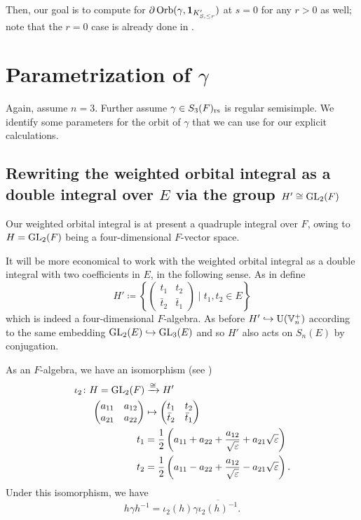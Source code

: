 Then, our goal is to compute for
$\partial \operatorname{Orb}(\gamma, \mathbf{1}_{K'_{S, \le r}})$
at $s=0$ for any $r > 0$ as well;
note that the $r = 0$ case is already done in \cite{ref:AFL}.

\section{Parametrization of $\gamma$}
Again, assume $n = 3$.
Further assume $\gamma \in S_3(F)_{\mathrm{rs}}$ is regular semisimple.
We identify some parameters for the orbit of $\gamma$
that we can use for our explicit calculations.

\subsection{Rewriting the weighted orbital integral as a double integral over $E$
  via the group $H' \cong \operatorname{GL}_2(F)$}
Our weighted orbital integral is at present a quadruple integral over $F$,
owing to $H = \operatorname{GL}_{2}(F)$ being a four-dimensional $F$-vector space.

It will be more economical to work with the weighted orbital integral
as a double integral with two coefficients in $E$, in the following sense.
As in \cite[\S4.1]{ref:AFL} define
\[ H' \coloneqq
  \left\{ \begin{pmatrix} t_1 & t_2 \\ \bar t_2 & \bar t_1 \end{pmatrix}
    \mid t_1, t_2 \in E \right\}
\]
which is indeed a four-dimensional $F$-algebra.
As before $H' \hookrightarrow \operatorname{U}(\mathbb V_n^+)$ according to the same embedding
$\operatorname{GL}_2(E) \hookrightarrow \operatorname{GL}_3(E)$
and so $H'$ also acts on $S_n(E)$ by conjugation.

As an $F$-algebra, we have an isomorphism (see \cite[\S4.1]{ref:AFL})
\begin{align*}
  \iota_2 \colon H = \operatorname{GL}_2(F)
  &\xrightarrow{\cong} H' \\
  \begin{pmatrix} a_{11} & a_{12} \\ a_{21} & a_{22} \end{pmatrix}
  &\mapsto \begin{pmatrix} t_1 & t_2 \\ \bar t_2 & \bar t_1 \end{pmatrix} \\
  t_1 &= \frac{1}{2}\left( a_{11} + a_{22} + \frac{a_{12}}{\sqrt{\varepsilon}} + a_{21} \sqrt{\varepsilon} \right) \\
  t_2 &= \frac{1}{2}\left( a_{11} - a_{22} + \frac{a_{12}}{\sqrt{\varepsilon}} - a_{21} \sqrt{\varepsilon} \right).
\end{align*}
Under this isomorphism, we have
\[ h \gamma h^{-1} = \iota_2(h) \gamma \overline{\iota_2(h)^{-1}}. \]

